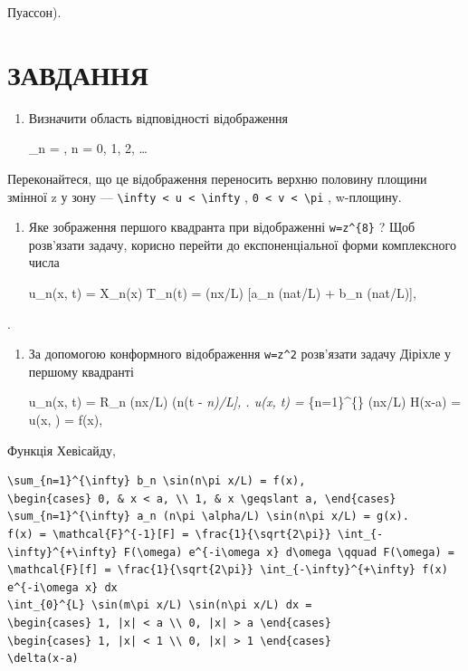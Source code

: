 \documentclass[
  ukrainian,
]{article}
\begin{document}
Пуассон).

\section{ЗАВДАННЯ}\label{ux437ux430ux432ux434ux430ux43dux43dux44f-11}

\begin{enumerate}
\def\labelenumi{\arabic{enumi}.}
\item
  Визначити область відповідності відображення

  \beta\_n = , \quad n = 0, 1, 2, \ldots
\end{enumerate}

Переконайтеся, що це відображення переносить верхню половину площини
змінної z у зону ---
\texttt{\textbackslash{}infty\ \textless{}\ u\ \textless{}\ \textbackslash{}infty}
, \texttt{0\ \textless{}\ v\ \textless{}\ \textbackslash{}pi} ,
w-площину.

\begin{enumerate}
\def\labelenumi{\arabic{enumi}.}
\setcounter{enumi}{1}
\item
  Яке зображення першого квадранта при відображенні
  \texttt{w=z\^{}\{8\}} ? Щоб розв'язати задачу, корисно перейти до
  експоненціальної форми комплексного числа

  u\_n(x, t) = X\_n(x) T\_n(t) = \sin(n\pi x/L) {[}a\_n \sin(n\pi at/L)
  + b\_n \cos(n\pi at/L){]},
\end{enumerate}

.

\begin{enumerate}
\def\labelenumi{\arabic{enumi}.}
\setcounter{enumi}{2}
\item
  За допомогою конформного відображення \texttt{w=z\^{}2} розв'язати
  задачу Діріхле у першому квадранті

  u\_n(x, t) = R\_n \sin(n\pi x/L) \cos(n\pi\alpha (t -
  \delta\emph{n)/L{]}, \right. u(x, t) = \sum}\{n=1\}\^{}\{\infty\}
  \sin(n\pi x/L)
   H(x-a) = u(x, \theta) = f(x),
\end{enumerate}

Функція Хевісайду,

\begin{verbatim}
\sum_{n=1}^{\infty} b_n \sin(n\pi x/L) = f(x),
\begin{cases} 0, & x < a, \\ 1, & x \geqslant a, \end{cases}
\sum_{n=1}^{\infty} a_n (n\pi \alpha/L) \sin(n\pi x/L) = g(x).
f(x) = \mathcal{F}^{-1}[F] = \frac{1}{\sqrt{2\pi}} \int_{-\infty}^{+\infty} F(\omega) e^{-i\omega x} d\omega \qquad F(\omega) = \mathcal{F}[f] = \frac{1}{\sqrt{2\pi}} \int_{-\infty}^{+\infty} f(x) e^{-i\omega x} dx
\int_{0}^{L} \sin(m\pi x/L) \sin(n\pi x/L) dx =
\begin{cases} 1, |x| < a \\ 0, |x| > a \end{cases}
\begin{cases} 1, |x| < 1 \\ 0, |x| > 1 \end{cases}
\delta(x-a)
\end{verbatim}
\end{document}

